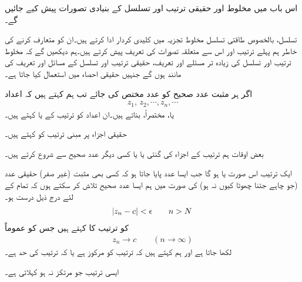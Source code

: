 اس باب میں مخلوط اور حقیقی ترتیب اور تسلسل کے بنیادی تصورات پیش کیے جائیں گے۔

تسلسل، بالخصوص طاقتی تسلسل مخلوط تجزیہ میں کلیدی کردار ادا کرتے ہیں۔ان کو متعارف کرنے کی خاطر ہم پہلے ترتیب اور اس سے متعلقہ تصورات کی تعریف پیش کرتے ہیں۔ہم دیکھیں گے کہ مخلوط  ترتیب اور تسلسل کی زیادہ تر مسئلے اور تعریف، حقیقی ترتیب اور تسلسل کے مسائل اور تعریف کی مانند ہوں گے جنہیں حقیقی احصاء میں استعمال کیا جاتا ہے۔

اگر ہر مثبت عدد صحیح  کو عدد  مختص کی جائے تب  ہم کہتے ہیں کہ اعداد
\begin{align*}
z_1,\,z_2,\cdots,z_n,\cdots
\end{align*} 
 یا،  مختصراً،  بناتے ہیں۔ان  اعداد  کو ترتیب کے  یا   کہتے ہیں۔

حقیقی اجزاء پر مبنی ترتیب کو  کہتے ہیں۔

بعض اوقات ہم ترتیب کے اجزاء کی گنتی  یا  یا کسی دیگر عدد صحیح سے شروع کرتے ہیں۔

ایک ترتیب  اس صورت   یا  ہو گا جب ایسا عدد  پایا جاتا ہو کہ کسی بھی مثبت  (غیر صفر) حقیقی عدد  (جو چاہے جتنا چھوٹا کیوں نہ ہو) کی صورت میں ہم ایسا عدد صحیح  تلاش کر سکتے ہوں کہ  تمام  کے لئے درج ذیل درست ہو۔
\begin{align}\label{مساوات_ترتیب_حد_الف}
\abs{z_n-c}<\epsilon \quad \quad  n>N
\end{align}
 کو ترتیب کا  کہتے ہیں جس کو عموماً
\begin{align*}
z_n\to c\quad\quad (n\to \infty)
\end{align*}
لکھا جاتا ہے اور ہم کہتے ہیں کہ ترتیب  کو مرکوز ہے یا کہ ترتیب کی حد  ہے۔

ایسی ترتیب جو مرتکز نہ ہو  کہلاتی ہے۔

